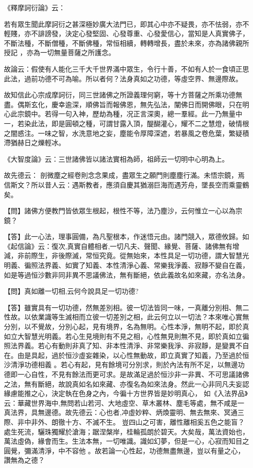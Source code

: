 《釋摩訶衍論》云：{\kaishu 若有眾生聞此摩訶衍之甚深極妙廣大法門已，即其心中亦不疑畏，亦不怯弱，亦不輕賤，亦不誹謗發，決定心發堅固、心發尊重、心發愛信心，當知是人真實佛子，不斷法種，不斷僧種，不斷佛種，常恒相續，轉轉增長，盡於未來，亦為諸佛親所授記
  ，亦為一切無量菩薩之所護念。
  
  故論云：{\kaiti 假使有人能化三千大千世界滿中眾生，令行十善，不如有人於一食頃正思此法，過前功德不可為喻。所以者何？法身真如之功德，等虛空界、無邊際故。}

故知信此心宗成摩訶衍，同三世諸佛之所證義理何窮，等十方菩薩之所乘功德無盡。偶斯玄化，慶幸逾深，順佛旨而報佛恩，無先弘法，闡佛日而開佛眼，只在明心此宗鏡中。若得一句入神，歷劫為種，况正言深奧，總一羣經。此一乃無量中一，若染此法，即是圓頓之種，可謂甘露入頂，醍醐灌心，耀不二之慧燈，破情根之闇惑注。一味之智，水洗意地之妄，塵能令厚障深遮，若暴風之卷危葉，繁疑積滯猶赫日之爍輕冰。

《大智度論》云：{\kaishu 三世諸佛皆以諸法實相為師，祖師云一切明中心明為上。}

故先德云： {\kaishu 剖微塵之經卷則念念果成，盡眾生之願門則塵塵行滿}。未悟宗鏡，焉信斯文？所以昔人云：{\kaishu 遇斯教者，應須自慶其猶溺巨海而遇芳舟，墜長空而乘靈鶴矣}。


{\heiti 【問】諸佛方便教門皆依眾生根起，根性不等，法乃塵沙，云何惟立一心以為宗鏡？}

【答】此一心法，理事圓備，為凡聖根本，作迷悟元由。諸門競入，眾德攸歸。如《起信論》云：{\kaishu 復次,真實自體相者,一切凡夫、聲聞、緣覺、菩薩、諸佛無有增減，非前際生，非後際滅，常恒究竟。從無始來，本性具足一切功德，謂大智慧光明義、徧照法界義、如實了知義、本性清淨心義、常樂我淨義、寂靜不變自在義，如是等過恒沙數非同非異不思議佛法，無有斷絕，依此義故名如來藏，亦名法身}。
  
  {\heiti 【問】真如離一切相,云何今說具足一切功德?}
  
  【答】雖實具有一切功德，然無差別相。彼一切法皆同一味，一真離分別相、無二性故。以依業識等生滅相而立彼一切差別之相，此云何立以一切法？本來唯心實無分別，以不覺故，分別心起，見有境界，名為無明。心性本淨，無明不起，即於真如立大智慧光明義。若心生見境則有不見之相，心性無見則無不見，即於真如立徧照法界義。若心有動則非真了知、非本性清淨、非常樂我淨、非寂靜，是變異不自在。由是具起，過於恒沙虛妄雜染，以心性無動故，即立真實了知義，乃至過於恒沙清淨功德相義
  。若心有起，見有餘境可分別求，則於內法有所不足，以無邊功德即一心自性，不見有餘法而更可求。是故滿足過於恒沙非一非異、不可思議諸佛之法，無有斷絕，故說真如名如來藏、亦復名為如來法身。然此一心非同凡夫妄認緣慮能推之心，決定執在色身之內，今徧十方世界皆是妙明真心，
  如《入法界品》云：{\kaishu 華藏世界海中,無問若山若河、大地虛空、草木叢林、塵毛等處，無不咸是一真法界，具無邊德}。故先德云：{\kaishu 心也者,冲虛妙粹、炳煥靈明、無去無來、冥通三際、非中非外、朗徹十方、不滅不生。} 豈四山之可害，離性離相奚五色之能盲？處生死流，驪珠獨耀於滄海；踞涅槃岸，桂輪孤朗於碧天。大矣哉，萬法資始也，萬法虛偽，緣會而生。生法本無，一切唯識。識如幻夢，但是一心，心寂而知目之圓覺，彌滿清淨，中不容他
  。故若論一心性起，功德無盡無邊，豈以有量之心，讚無為之德？

}
